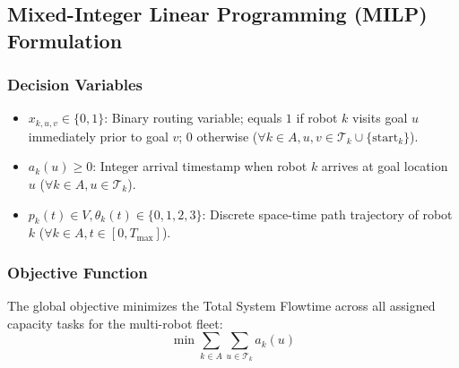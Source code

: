 \documentclass[journal]{IEEEtran}
\begin{document}
\subsection{Mixed-Integer Linear Programming (MILP) Formulation}

\subsubsection{Decision Variables}
\begin{itemize}
    \item $x_{k, u, v} \in \{0, 1\}$: Binary routing variable; equals $1$ if robot $k$ visits goal $u$ immediately prior to goal $v$; $0$ otherwise ($\forall k \in A, u, v \in \mathcal{T}_k \cup \{\text{start}_k\}$).
    \item $a_k(u) \ge 0$: Integer arrival timestamp when robot $k$ arrives at goal location $u$ ($\forall k \in A, u \in \mathcal{T}_k$).
    \item $p_k(t) \in V, \theta_k(t) \in \{0, 1, 2, 3\}$: Discrete space-time path trajectory of robot $k$ ($\forall k \in A, t \in [0, T_{\max}]$).
\end{itemize}

\subsubsection{Objective Function}
The global objective minimizes the Total System Flowtime across all assigned capacity tasks for the multi-robot fleet:
\begin{equation}
\min \sum_{k \in A} \sum_{u \in \mathcal{T}_k} a_k(u)
\end{equation}
\end{document}
